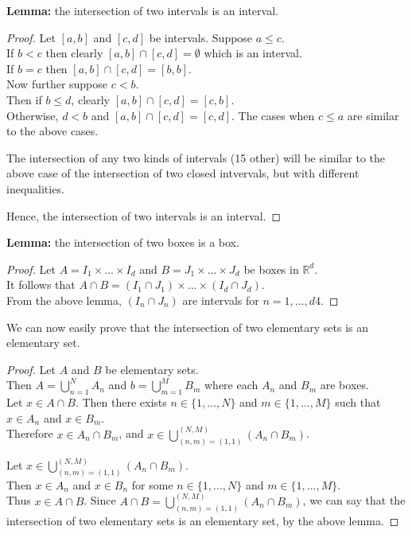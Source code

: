 \documentclass[12pt]{article}
\begin{document}
	\textbf{Lemma:} the intersection of two intervals is an interval.
	
	\begin{proof}
		Let $[a,b]$ and $[c,d]$ be intervals. \bigbreak
		Suppose $a \leq c$. \\
		If $ b < c$ then clearly $[a,b] \cap [c,d] = \emptyset$ which is an interval. \\
		If $b=c$ then $[a,b] \cap [c,d] = [b,b]$. \\
		Now further suppose $ c < b$. \\
		Then if $b \leq d$, clearly $[a,b] \cap [c,d] = [c,b]$. \\
		Otherwise, $ d < b$ and $[a,b] \cap [c,d] = [c,d]$. \bigbreak
		The cases when $c \leq a$ are similar to the above cases. \bigbreak
		
		The intersection of any two kinds of intervals (15 other) will be similar to the above case of the intersection of two closed intvervals, but with different inequalities. \bigbreak
		
		Hence, the intersection of two intervals is an interval.		
	\end{proof}

	\textbf{Lemma:} the intersection of two boxes is a box.
	
	\begin{proof}
		Let $A = I_{1} \times ... \times I_{d}$ and $B = J_{1} \times ... \times J_{d}$ be boxes in $\mathds{R}^{d}$. \\
		It follows that $A \cap B = (I_{1} \cap J_{1}) \times ... \times (I_{d} \cap J_{d})$. \\
		From the above lemma, $(I_{n} \cap J_{n})$ are intervals for $n=1,...,d4$.
	\end{proof}

	We can now easily prove that the intersection of two elementary sets is an elementary set.
	
	\begin{proof}
		Let $A$ and $B$ be elementary sets. \\
		Then $A=\bigcup\limits_{n=1}^{N}A_{n}$ and $b=\bigcup\limits_{m=1}^{M}B_{m}$ where each $A_{n}$ and $B_{m}$ are boxes. \\
		Let $x \in A \cap B$.
		Then there exists $n \in \{1,...,N\}$ and $m \in \{1,...,M\}$ such that $x \in A_{n}$ and $x \in B_{m}$. \\
		Therefore $x \in A_{n} \cap B_{m}$, and $x \in \bigcup\limits_{(n,m)=(1,1)}^{(N,M)}(A_{n} \cap B_{m})$. \bigbreak
		
		Let $x \in \bigcup\limits_{(n,m)=(1,1)}^{(N,M)}(A_{n} \cap B_{m})$. \\
		Then $x \in A_{n}$ and $x \in B_{n}$ for some $n \in \{1,...,N\}$ and $m \in \{1,...,M\}$. \\
		Thus $x \in A \cap B$. \bigbreak
		Since  $A \cap B = \bigcup\limits_{(n,m)=(1,1)}^{(N,M)}(A_{n} \cap B_{m})$, we can say that the intersection of two elementary sets is an elementary set, by the above lemma.
	\end{proof}
\end{document}
